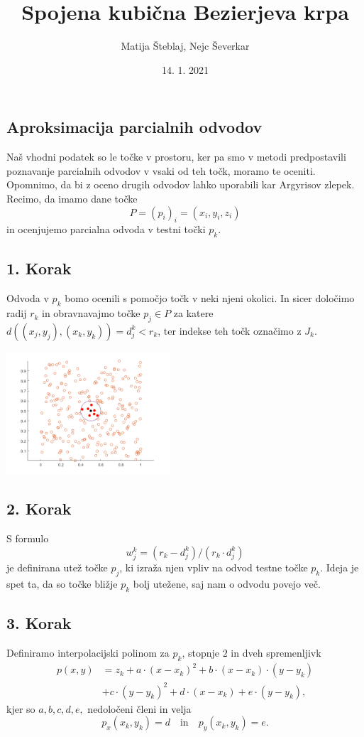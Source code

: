 \documentclass[ignorenonframetext]{beamer}
\title{Spojena kubična Bezierjeva krpa}
\author{Matija Šteblaj, Nejc Ševerkar}
\date{14. 1. 2021}
\let\frametitle\subsection %
\begin{document}
\begin{frame}
\titlepage
\end{frame}

\begin{frame}
\frametitle{Aproksimacija parcialnih odvodov}

Naš vhodni podatek so le točke v prostoru, ker pa smo v metodi predpostavili 
poznavanje parcialnih odvodov v vsaki od teh točk, moramo te oceniti.
\vspace{10px}
Opomnimo, da bi z oceno drugih odvodov lahko uporabili kar Argyrisov zlepek.
\vspace{10px}
Recimo, da imamo dane točke
$$P = (p_i)_i = (x_i,y_i,z_i)$$
in ocenjujemo parcialna odvoda v testni točki $p_k$.
\end{frame}

\begin{frame}
\frametitle{1. Korak}
Odvoda v $p_k$ bomo ocenili s pomočjo točk v neki njeni okolici. 
In sicer določimo radij $r_k$ in obravnavajmo točke $p_j \in P$ za katere $d((x_j,y_j), (x_k,y_k)) = d^k_j < r_k$,
ter indekse teh točk označimo z $J_k$.
\begin{center}
	\includegraphics[width=230px]{slike/pointRadius.png}
\end{center}
\end{frame}

\begin{frame}
\frametitle{2. Korak}
S formulo 
$$w^k_j = (r_k - d^k_j) / (r_k \cdot d^k_j)$$
je definirana utež točke $p_j$, ki izraža njen vpliv na odvod testne točke $p_k$.
Ideja je spet ta, da so točke bližje $p_k$ bolj utežene, saj nam o odvodu povejo več.
\end{frame}

\begin{frame}
\frametitle{3. Korak}
Definiramo interpolacijski polinom za $p_k$, stopnje $2$ in dveh spremenljivk
\begin{equation*}
\begin{aligned}
p(x,y) &= z_k + a \cdot (x - x_k)^2 + b \cdot (x - x_k) \cdot (y - y_k) \\
&+ c \cdot (y - y_k)^2 + d \cdot (x-x_k) + e\cdot(y-y_k),
\end{aligned}
\end{equation*}
kjer so $a,b,c,d,e,$ nedoločeni členi in velja 
$$p_x(x_k,y_k) = d \quad \text{in} \quad p_y(x_k,y_k) = e.$$
\end{frame}
\end{document}

